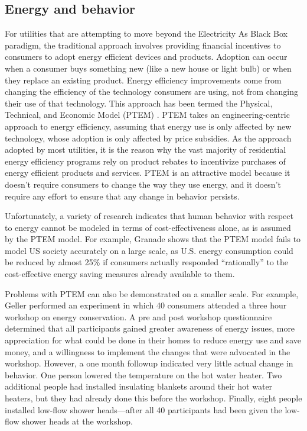 
\subsection{Energy and behavior}

For utilities that are attempting to move beyond the Electricity As Black
Box paradigm, the traditional approach involves providing financial
incentives to consumers to adopt energy efficient devices and products.
Adoption can occur when a consumer buys something new (like a new house or
light bulb) or when they replace an existing product.  Energy efficiency
improvements come from changing the efficiency of the technology consumers
are using, not from changing their use of that technology.  This approach
has been termed the Physical, Technical, and Economic Model (PTEM)
\cite{Lutzenhiser93}.  PTEM takes an engineering-centric approach to energy
efficiency, assuming that energy use is only affected by new technology,
whose adoption is only affected by price subsidies. As the approach adopted
by most utilities, it is the reason why the vast majority of residential
energy efficiency programs rely on product rebates to incentivize purchases
of energy efficient products and services. PTEM is an attractive model
because it doesn't require consumers to change the way they use energy, and
it doesn't require any effort to ensure that any change in behavior
persists.

Unfortunately, a variety of research indicates that human behavior with
respect to energy cannot be modeled in terms of cost-effectiveness alone,
as is assumed by the PTEM model.  For example, Granade \cite{Granade09}
shows that the PTEM model fails to model US society accurately on a large
scale, as U.S. energy consumption could be reduced by almost 25\% if
consumers actually responded ``rationally'' to the cost-effective energy
saving measures already available to them.

Problems with PTEM can also be demonstrated on a smaller scale.  For
example, Geller \cite{Geller81} performed an experiment in which 40
consumers attended a three hour workshop on energy conservation.  A pre and
post workshop questionnaire determined that all participants gained greater
awareness of energy issues, more appreciation for what could be done in
their homes to reduce energy use and save money, and a willingness to
implement the changes that were advocated in the workshop. However, a one
month followup indicated very little actual change in behavior. One person
lowered the temperature on the hot water heater. Two additional people had
installed insulating blankets around their hot water heaters, but they had
already done this before the workshop. Finally, eight people installed
low-flow shower heads---after all 40 participants had been given the
low-flow shower heads at the workshop.

